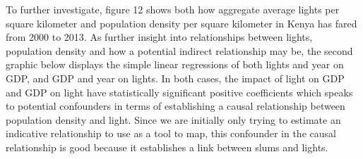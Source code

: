To further investigate, figure 12 shows both how aggregate average lights per square kilometer and population density per square kilometer in Kenya has fared from 2000 to 2013. As further insight into relationships between lights, population density and how a potential indirect relationship may be, the second graphic below displays the simple linear regressions of both lights and year on GDP, and GDP and year on lights. In both cases, the impact of light on GDP and GDP on light have statistically significant positive coefficients which speaks to potential confounders in terms of establishing a causal relationship between population density and light. Since we are initially only trying to estimate an indicative relationship to use as a tool to map, this confounder in the causal relationship is good because it establishes a link between slums and lights.

